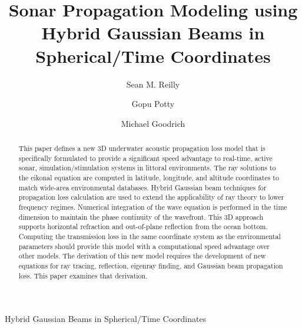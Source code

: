 \documentclass{ws-jca}
\newcommand{\threeD}{3\nobreakdash\textendash D }	%
\begin{document}
{Hybrid Gaussian Beams in Spherical/Time Coordinates}

%
\catchline{}{}{}{}{}
%

\title{Sonar Propagation Modeling using Hybrid Gaussian Beams in Spherical/Time Coordinates}

\author{Sean M. Reilly}
\address{Department of Ocean Engineering, University of Rhode Island,\\
Narragansett RI, USA\\
 }

\author{Gopu Potty}
\address{Department of Ocean Engineering, University of Rhode Island,\\
Narragansett RI, USA\\
 }

\author{Michael Goodrich}
\address{Alion Science and Tecnology Corporation,\\
Norfolk VA, USA\\
 }

\maketitle

\begin{history}
\end{history}

\begin{abstract}
This paper defines a new \threeD underwater acoustic propagation loss model that is
specifically formulated to provide a significant speed advantage to real-time, active sonar, simulation/stimulation systems in littoral environments.  The ray
solutions to the eikonal equation are computed in latitude, longitude, and
altitude coordinates to match wide-area environmental databases. Hybrid
Gaussian beam techniques for propagation loss calculation are used to
extend the applicability of ray theory to lower frequency regimes.
Numerical integration of the wave equation is performed in the time
dimension to maintain the phase continuity of the wavefront. This \threeD
approach supports horizontal refraction and 
out-of-plane reflection from the ocean bottom. 
Computing the transmission loss in the same coordinate system as the
environmental parameters should provide this model with a computational
speed advantage over other models. The derivation of this new model
requires the development of new equations for ray tracing, reflection,
eigenray finding, and Gaussian beam propagation loss. This paper examines
that derivation.
\end{abstract}
\end{document}
